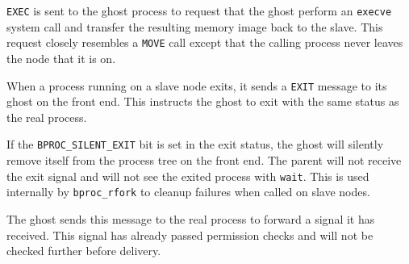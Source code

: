 \begin{description}
  \begin{reqresp}
  \noresponse
  \end{reqresp}


  \texttt{EXEC} is sent to the ghost process to request that the ghost
  perform an \texttt{execve} system call and transfer the resulting
  memory image back to the slave.  This request closely resembles a
  \texttt{MOVE} call except that the calling process never leaves the
  node that it is on.

  \begin{reqresp}
  \response
  \end{reqresp}


  When a process running on a slave node exits, it sends a
  \texttt{EXIT} message to its ghost on the front end.  This instructs
  the ghost to exit with the same status as the real process.

  If the \texttt{BPROC\_SILENT\_EXIT} bit is set in the exit status,
  the ghost will silently remove itself from the process tree on the
  front end.  The parent will not receive the exit signal and will not
  see the exited process with \texttt{wait}.  This is used internally
  by \texttt{bproc\_rfork} to cleanup failures when called on slave
  nodes.

  \begin{reqresp}
  \noresponse
  \end{reqresp}


  The ghost sends this message to the real process to forward a signal
  it has received.  This signal has already passed permission checks
  and will not be checked further before delivery.


\end{description}
